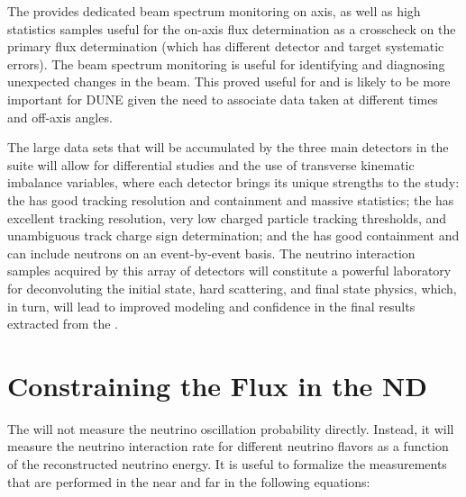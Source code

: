 The  provides dedicated beam spectrum monitoring on axis, as well as high statistics samples  useful for the on-axis flux determination as a crosscheck on the primary flux determination (which has different detector and target systematic errors). The beam spectrum monitoring is useful for identifying and diagnosing unexpected changes in the beam.  This proved useful for  and is likely to be more important for DUNE given the need to associate data taken at different times and off-axis angles. 



The large data sets that will be accumulated by the three main detectors in the   suite will allow for differential studies and the use of transverse kinematic imbalance variables, where each detector brings its unique strengths to the study: the  has good tracking resolution and containment and massive statistics; the  has excellent tracking resolution, very low charged particle tracking thresholds, and unambiguous track charge sign determination; and the  has good containment and can include neutrons on an event-by-event basis. The neutrino interaction samples acquired by this array of detectors will constitute a powerful laboratory for deconvoluting the initial state, hard scattering, and final state physics, which, in turn, will lead to improved modeling and confidence in the final results extracted from the  .  




\section{Constraining the Flux in the ND}
\label{sec:appx-nd:fluxappendix}


The    will not measure the neutrino oscillation probability directly. Instead, it will measure the neutrino interaction rate for different neutrino flavors as a function of the reconstructed neutrino energy. It is useful to formalize the measurements that are performed in the near and  far  in the following equations:


